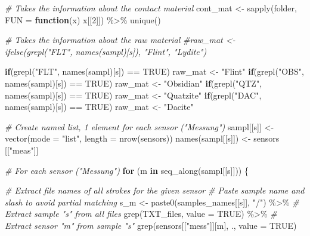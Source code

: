 \documentclass[
]{article}
\newenvironment{Shaded}{\begin{snugshade}}{\end{snugshade}}
\newcommand{\AttributeTok}[1]{\textcolor[rgb]{0.77,0.63,0.00}{#1}}
\newcommand{\CommentTok}[1]{\textcolor[rgb]{0.56,0.35,0.01}{\textit{#1}}}
\newcommand{\ConstantTok}[1]{\textcolor[rgb]{0.00,0.00,0.00}{#1}}
\newcommand{\ControlFlowTok}[1]{\textcolor[rgb]{0.13,0.29,0.53}{\textbf{#1}}}
\newcommand{\DecValTok}[1]{\textcolor[rgb]{0.00,0.00,0.81}{#1}}
\newcommand{\FunctionTok}[1]{\textcolor[rgb]{0.00,0.00,0.00}{#1}}
\newcommand{\NormalTok}[1]{#1}
\newcommand{\OtherTok}[1]{\textcolor[rgb]{0.56,0.35,0.01}{#1}}
\newcommand{\SpecialCharTok}[1]{\textcolor[rgb]{0.00,0.00,0.00}{#1}}
\newcommand{\StringTok}[1]{\textcolor[rgb]{0.31,0.60,0.02}{#1}}
\begin{document}
\begin{Shaded}
\begin{Highlighting}[]
  \CommentTok{\# Takes the information about the contact material}
\NormalTok{  cont\_mat }\OtherTok{\textless{}{-}} \FunctionTok{sapply}\NormalTok{(folder, }\AttributeTok{FUN =} \ControlFlowTok{function}\NormalTok{(x) x[[}\DecValTok{2}\NormalTok{]]) }\SpecialCharTok{\%\textgreater{}\%} 
              \FunctionTok{unique}\NormalTok{()}
  
  \CommentTok{\# Takes the information about the raw material}
  \CommentTok{\#raw\_mat \textless{}{-} ifelse(grepl("FLT", names(sampl)[s]), "Flint", "Lydite")}

  \ControlFlowTok{if}\NormalTok{(}\FunctionTok{grepl}\NormalTok{(}\StringTok{"FLT"}\NormalTok{, }\FunctionTok{names}\NormalTok{(sampl)[s]) }\SpecialCharTok{==} \ConstantTok{TRUE}\NormalTok{) raw\_mat }\OtherTok{\textless{}{-}} \StringTok{"Flint"}
  \ControlFlowTok{if}\NormalTok{(}\FunctionTok{grepl}\NormalTok{(}\StringTok{"OBS"}\NormalTok{, }\FunctionTok{names}\NormalTok{(sampl)[s]) }\SpecialCharTok{==} \ConstantTok{TRUE}\NormalTok{) raw\_mat }\OtherTok{\textless{}{-}} \StringTok{"Obsidian"}
  \ControlFlowTok{if}\NormalTok{(}\FunctionTok{grepl}\NormalTok{(}\StringTok{"QTZ"}\NormalTok{, }\FunctionTok{names}\NormalTok{(sampl)[s]) }\SpecialCharTok{==} \ConstantTok{TRUE}\NormalTok{) raw\_mat }\OtherTok{\textless{}{-}} \StringTok{"Quatzite"}
  \ControlFlowTok{if}\NormalTok{(}\FunctionTok{grepl}\NormalTok{(}\StringTok{"DAC"}\NormalTok{, }\FunctionTok{names}\NormalTok{(sampl)[s]) }\SpecialCharTok{==} \ConstantTok{TRUE}\NormalTok{) raw\_mat }\OtherTok{\textless{}{-}} \StringTok{"Dacite"}
  
  \CommentTok{\# Create named list, 1 element for each sensor ("Messung")}
\NormalTok{  sampl[[s]] }\OtherTok{\textless{}{-}} \FunctionTok{vector}\NormalTok{(}\AttributeTok{mode =} \StringTok{"list"}\NormalTok{, }\AttributeTok{length =} \FunctionTok{nrow}\NormalTok{(sensors))}
  \FunctionTok{names}\NormalTok{(sampl[[s]]) }\OtherTok{\textless{}{-}}\NormalTok{ sensors [[}\StringTok{"meas"}\NormalTok{]]}
  
  \CommentTok{\# For each sensor ("Messung")}
  \ControlFlowTok{for}\NormalTok{ (m }\ControlFlowTok{in} \FunctionTok{seq\_along}\NormalTok{(sampl[[s]])) \{}
      
    \CommentTok{\# Extract file names of all strokes for the given sensor}
    \CommentTok{\# Paste sample name and slash to avoid partial matching}
\NormalTok{    s\_m }\OtherTok{\textless{}{-}} \FunctionTok{paste0}\NormalTok{(samples\_names[[s]], }\StringTok{"/"}\NormalTok{) }\SpecialCharTok{\%\textgreater{}\%} 
           \CommentTok{\# Extract sample "s" from all files}
           \FunctionTok{grep}\NormalTok{(TXT\_files, }\AttributeTok{value =} \ConstantTok{TRUE}\NormalTok{) }\SpecialCharTok{\%\textgreater{}\%} 
           \CommentTok{\# Extract sensor "m" from sample "s"}
           \FunctionTok{grep}\NormalTok{(sensors[[}\StringTok{"mess"}\NormalTok{]][m], ., }\AttributeTok{value =} \ConstantTok{TRUE}\NormalTok{) }
    

\end{Highlighting}
\end{Shaded}
\end{document}
